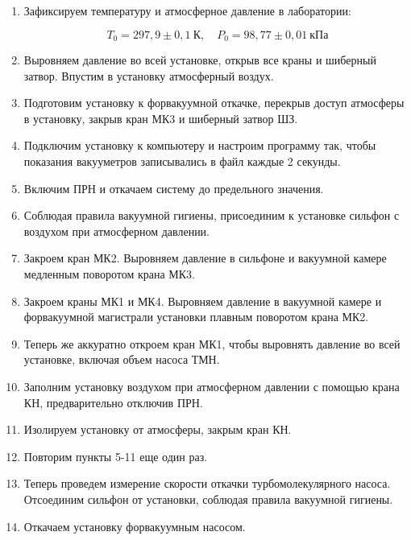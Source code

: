 \documentclass[14pt, a4paper]{report}
\begin{document}
\begin{enumerate}

\item Зафиксируем температуру и атмосферное давление в лаборатории:

\[T_0=297,9\pm0,1\ К,\quad P_0=98,77\pm0,01\ кПа\]

\item Выровняем давление во всей установке, открыв все краны и шиберный затвор. Впустим в установку атмосферный воздух.

\item Подготовим установку к форвакуумной откачке, перекрыв доступ атмосферы в установку, закрыв кран МК3 и шиберный затвор ШЗ.

\item Подключим установку к компьютеру и настроим программу так, чтобы показания вакууметров записывались в файл каждые 2 секунды.

\item Включим ПРН и откачаем систему до предельного значения.

\item Соблюдая правила вакуумной гигиены, присоединим к установке сильфон с воздухом при атмосферном давлении.

\item Закроем кран МК2. Выровняем давление в сильфоне и вакуумной камере медленным поворотом крана МК3.

\item Закроем краны МК1 и МК4. Выровняем давление в вакуумной камере и форвакуумной магистрали установки плавным поворотом крана МК2.

\item Теперь же аккуратно откроем кран МК1, чтобы выровнять давление во всей установке, включая объем насоса ТМН.

\item Заполним установку воздухом при атмосферном давлении с помощью крана КН, предварительно отключив ПРН.

\item Изолируем установку от атмосферы, закрым кран КН.

\item Повторим пункты 5-11 еще один раз.

\item Теперь проведем измерение скорости откачки турбомолекулярного насоса. Отсоединим сильфон от установки, соблюдая правила вакуумной гигиены.

\item Откачаем установку форвакуумным насосом.


\end{enumerate}
\end{document}
